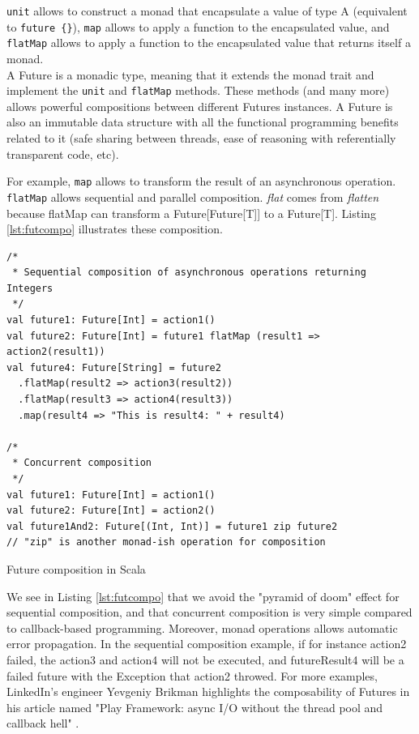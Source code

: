 \verb|unit| allows to construct a monad that encapsulate a value of type A (equivalent to \verb|future {}|), \verb|map| allows to apply a function to 
the encapsulated value, and \verb|flatMap| allows to apply a function to the encapsulated value that returns itself a monad.
\\

A Future is a monadic type, meaning that it extends the monad trait and implement the \verb|unit| and \verb|flatMap| methods.
These methods (and many more) allows powerful compositions between different Futures instances. A Future is also an immutable
data structure with all the functional programming benefits related to it (safe sharing between threads, ease of reasoning with referentially transparent code, etc).

For example, \verb|map| allows to transform the result of an asynchronous operation. \verb|flatMap| allows sequential and 
parallel composition. \textit{flat} comes from \textit{flatten} because flatMap can transform a Future[Future[T]] to a Future[T].
Listing \ref{lst:futcompo} illustrates these composition.

\begin{listing}[h]
\begin{verbatim}
/*
 * Sequential composition of asynchronous operations returning Integers
 */
val future1: Future[Int] = action1()
val future2: Future[Int] = future1 flatMap (result1 => action2(result1))
val future4: Future[String] = future2
  .flatMap(result2 => action3(result2))
  .flatMap(result3 => action4(result3))
  .map(result4 => "This is result4: " + result4)

/*
 * Concurrent composition
 */
val future1: Future[Int] = action1()
val future2: Future[Int] = action2()
val future1And2: Future[(Int, Int)] = future1 zip future2
// "zip" is another monad-ish operation for composition 
\end{verbatim}
\caption{Future composition in Scala}
\label{lst:futcompo}
\end{listing}

We see in Listing \ref{lst:futcompo} that we avoid the "pyramid of doom" effect for sequential composition, and that concurrent composition is very simple
compared to callback-based programming. Moreover, monad operations allows automatic error propagation. In the sequential composition example,
if for instance action2 failed, the action3 and action4 will not be executed, and futureResult4 will be a failed future with the Exception
that action2 throwed. For more examples, LinkedIn's engineer Yevgeniy Brikman highlights the composability of Futures in his article named
"Play Framework: async I/O without the thread pool and callback hell" .
\\

